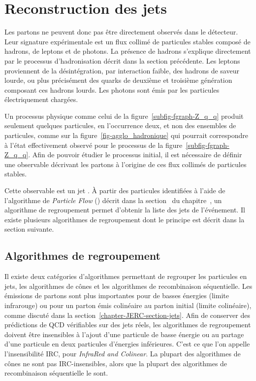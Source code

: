 \section{Reconstruction des jets}\label{chapter-JERC-section-jets_reco}
Les partons ne peuvent donc pas être directement observés dans le détecteur.
Leur signature expérimentale est un flux collimé de particules stables composé de hadrons, de leptons et de photons.
La présence de hadrons s'explique directement par le processus d'hadronisation décrit dans la section précédente.
Les leptons proviennent de la désintégration, par interaction faible, des hadrons de saveur lourde, ou plus précisément des quarks de deuxième et troisième génération composant ces hadrons lourds.
Les photons sont émis par les particules électriquement chargées.
\par Un processus physique comme celui de la figure~\ref{subfig-fgraph-Z_q_q} produit seulement quelques particules, en l'occurrence deux, et non des ensembles de particules, comme sur la figure~\ref{fig-agglo_hadronique} qui pourrait correspondre à l'état effectivement observé pour le processus de la figure~\ref{subfig-fgraph-Z_q_q}.
Afin de pouvoir étudier le processus initial, il est nécessaire de définir une observable décrivant les partons à l'origine de ces flux collimés de particules stables.
\par Cette observable est un \og jet \fg.
À partir des particules identifiées à l'aide de l'algorithme de \emph{Particle Flow} (\PF) décrit dans la section~ du chapitre~, un algorithme de regroupement permet d'obtenir la liste des jets de l'événement.
Il existe plusieurs algorithmes de regroupement dont le principe est décrit dans la section suivante.
\subsection{Algorithmes de regroupement}\label{chapter-JERC-section-jets_reco-subsec-algo}
Il existe deux catégories d'algorithmes permettant de regrouper les particules en jets, les algorithmes de cônes et les algorithmes de recombinaison séquentielle.
Les émissions de partons sont plus importantes pour de basses énergies (limite infrarouge) ou pour un parton émis colinéaire au parton initial (limite colinéaire), comme discuté dans la section~\ref{chapter-JERC-section-jets}.
Afin de conserver des prédictions de QCD vérifiables sur des jets réels, les algorithmes de regroupement doivent être insensibles à l'ajout d'une particule de basse énergie ou au partage d'une particule en deux particules d'énergies inférieures. C'est ce que l'on appelle l'insensibilité IRC, pour \emph{InfraRed and Colinear}.
La plupart des algorithmes de cônes ne sont pas IRC-insensibles, alors que la plupart des algorithmes de recombinaison séquentielle le sont.
